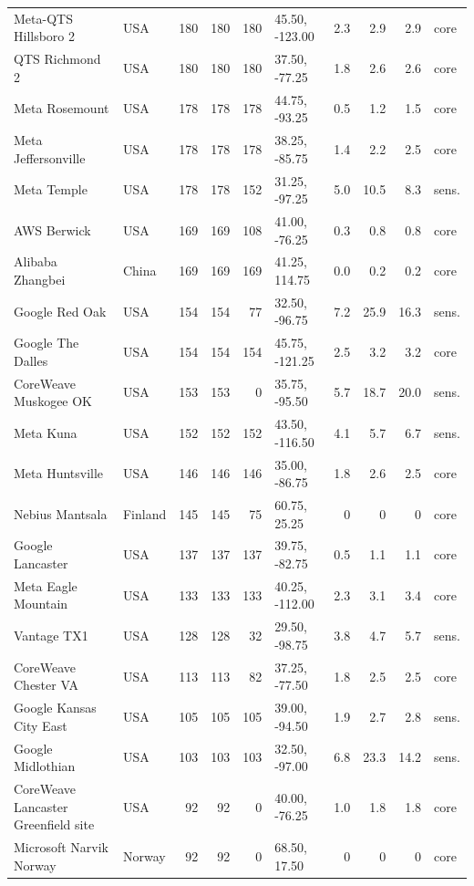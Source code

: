 \begin{footnotesize}
\begin{longtable}{@{}p{46mm}lrrrlrrrl@{}}
Meta-QTS Hillsboro 2 & USA & 180 & 180 & 180 & 45.50, -123.00 & 2.3 & 2.9 & 2.9 & core \\
QTS Richmond 2 & USA & 180 & 180 & 180 & 37.50, -77.25 & 1.8 & 2.6 & 2.6 & core \\
Meta Rosemount & USA & 178 & 178 & 178 & 44.75, -93.25 & 0.5 & 1.2 & 1.5 & core \\
Meta Jeffersonville & USA & 178 & 178 & 178 & 38.25, -85.75 & 1.4 & 2.2 & 2.5 & core \\
Meta Temple & USA & 178 & 178 & 152 & 31.25, -97.25 & 5.0 & 10.5 & 8.3 & sens. \\
AWS Berwick & USA & 169 & 169 & 108 & 41.00, -76.25 & 0.3 & 0.8 & 0.8 & core \\
Alibaba Zhangbei & China & 169 & 169 & 169 & 41.25, 114.75 & 0.0 & 0.2 & 0.2 & core \\
Google Red Oak & USA & 154 & 154 & 77 & 32.50, -96.75 & 7.2 & 25.9 & 16.3 & sens. \\
Google The Dalles & USA & 154 & 154 & 154 & 45.75, -121.25 & 2.5 & 3.2 & 3.2 & core \\
CoreWeave Muskogee OK & USA & 153 & 153 & 0 & 35.75, -95.50 & 5.7 & 18.7 & 20.0 & sens. \\
Meta Kuna & USA & 152 & 152 & 152 & 43.50, -116.50 & 4.1 & 5.7 & 6.7 & sens. \\
Meta Huntsville & USA & 146 & 146 & 146 & 35.00, -86.75 & 1.8 & 2.6 & 2.5 & core \\
Nebius Mantsala & Finland & 145 & 145 & 75 & 60.75, 25.25 & 0 & 0 & 0 & core \\
Google Lancaster & USA & 137 & 137 & 137 & 39.75, -82.75 & 0.5 & 1.1 & 1.1 & core \\
Meta Eagle Mountain & USA & 133 & 133 & 133 & 40.25, -112.00 & 2.3 & 3.1 & 3.4 & core \\
Vantage TX1 & USA & 128 & 128 & 32 & 29.50, -98.75 & 3.8 & 4.7 & 5.7 & sens. \\
CoreWeave Chester VA & USA & 113 & 113 & 82 & 37.25, -77.50 & 1.8 & 2.5 & 2.5 & core \\
Google Kansas City East & USA & 105 & 105 & 105 & 39.00, -94.50 & 1.9 & 2.7 & 2.8 & sens. \\
Google Midlothian & USA & 103 & 103 & 103 & 32.50, -97.00 & 6.8 & 23.3 & 14.2 & sens. \\
CoreWeave Lancaster Greenfield site & USA & 92 & 92 & 0 & 40.00, -76.25 & 1.0 & 1.8 & 1.8 & core \\
Microsoft Narvik Norway & Norway & 92 & 92 & 0 & 68.50, 17.50 & 0 & 0 & 0 & core \\

\end{longtable}
\end{footnotesize}
